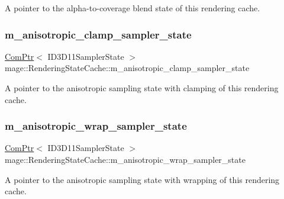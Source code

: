 A pointer to the alpha-\/to-\/coverage blend state of this rendering cache. \hypertarget{structmage_1_1_rendering_state_cache_a56467ab3877bfb1fa547efe4e4a62cc7}{}\label{structmage_1_1_rendering_state_cache_a56467ab3877bfb1fa547efe4e4a62cc7} 
\subsubsection{\texorpdfstring{m\+\_\+anisotropic\+\_\+clamp\+\_\+sampler\+\_\+state}{m\_anisotropic\_clamp\_sampler\_state}}
{\footnotesize\ttfamily \hyperlink{namespacemage_ae74f374780900893caa5555d1031fd79}{Com\+Ptr}$<$ I\+D3\+D11\+Sampler\+State $>$ mage\+::\+Rendering\+State\+Cache\+::m\+\_\+anisotropic\+\_\+clamp\+\_\+sampler\+\_\+state\hspace{0.3cm}{\ttfamily [private]}}

A pointer to the anisotropic sampling state with clamping of this rendering cache. \hypertarget{structmage_1_1_rendering_state_cache_ac44316b27ee83a1aeb9f8afc26b5a743}{}\label{structmage_1_1_rendering_state_cache_ac44316b27ee83a1aeb9f8afc26b5a743} 
\subsubsection{\texorpdfstring{m\+\_\+anisotropic\+\_\+wrap\+\_\+sampler\+\_\+state}{m\_anisotropic\_wrap\_sampler\_state}}
{\footnotesize\ttfamily \hyperlink{namespacemage_ae74f374780900893caa5555d1031fd79}{Com\+Ptr}$<$ I\+D3\+D11\+Sampler\+State $>$ mage\+::\+Rendering\+State\+Cache\+::m\+\_\+anisotropic\+\_\+wrap\+\_\+sampler\+\_\+state\hspace{0.3cm}{\ttfamily [private]}}

A pointer to the anisotropic sampling state with wrapping of this rendering cache. \hypertarget{structmage_1_1_rendering_state_cache_a4194ce92cb7cccd2ae219e13eaf7cfdc}{}\label{structmage_1_1_rendering_state_cache_a4194ce92cb7cccd2ae219e13eaf7cfdc} 
